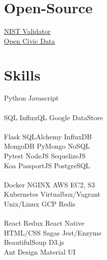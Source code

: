 \documentclass[]{deedy-resume-openfont}
\begin{document}
\begin{minipage}[t]{0.31\textwidth}
\section{Open-Source}
\color{blue}\underline{\color{blue}\href{https://github.com/google/election_results_xml_validator}{NIST Validator}} \\
\color{blue}\underline{\color{blue}\href{https://github.com/opencivicdata/ocd-division-ids}{Open Civic Data}}
\sectionsep


\section{Skills}
\sectionsep

Python \textbullet{} Javascript \\
\\[1\baselineskip]

SQL \textbullet{} InfluxQL \textbullet{} Google DataStore \\
\\[1\baselineskip]

Flask \textbullet{} SQLAlchemy \textbullet{} InfluxDB \\
MongoDB \textbullet{} PyMongo \textbullet{} NoSQL \\
Pytest \textbullet{} NodeJS \textbullet{} SequelizeJS  \\
Koa \textbullet{} PassportJS \textbullet{} PostgreSQL\\
\\[1\baselineskip]

Docker \textbullet{} NGINX \textbullet{} AWS EC2, S3 \\
Kubernetes \textbullet{} Virtualbox/Vagrant \\
Unix/Linux \textbullet{} GCP \textbullet{} Redis\\
\\[1\baselineskip]

React \textbullet{} Redux \textbullet{} React Native \\
 HTML/CSS \textbullet{} Sagas \textbullet{} Jest/Enzyme \\
 BeautifulSoup \textbullet{} D3.js \\
 Ant Design \textbullet{} Material UI \\
\\[1\baselineskip]

%
%

\end{minipage}
\end{document}
